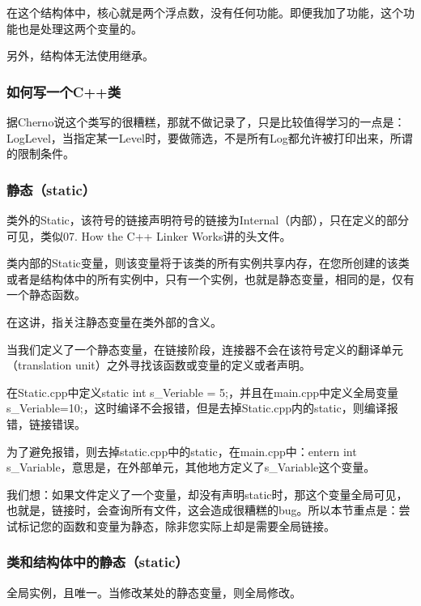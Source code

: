 在这个结构体中，核心就是两个浮点数，没有任何功能。即便我加了功能，这个功能也是处理这两个变量的。

另外，结构体无法使用继承。

\subsubsection{如何写一个C++类}

据Cherno说这个类写的很糟糕，那就不做记录了，只是比较值得学习的一点是：LogLevel，当指定某一Level时，要做筛选，不是所有Log都允许被打印出来，所谓的限制条件。

\subsubsection{静态（static）}

类外的Static，该符号的链接声明符号的链接为Internal（内部），只在定义的部分可见，类似07. How the C++ Linker Works讲的头文件。

类内部的Static变量，则该变量将于该类的所有实例共享内存，在您所创建的该类或者是结构体中的所有实例中，只有一个实例，也就是静态变量，相同的是，仅有一个静态函数。

在这讲，指关注静态变量在类外部的含义。

当我们定义了一个静态变量，在链接阶段，连接器不会在该符号定义的翻译单元（translation unit）之外寻找该函数或变量的定义或者声明。

在Static.cpp中定义{\ncodestyle static int s_Veriable = 5;}，并且在main.cpp中定义全局变量{\ncodestyle  s_Veriable=10;}，这时编译不会报错，但是去掉Static.cpp内的{\ncodestyle static}，则编译报错，链接错误。

为了避免报错，则去掉static.cpp中的{\ncodestyle static}，在main.cpp中：{\ncodestyle entern int s_Variable}，意思是，在外部单元，其他地方定义了{\ncodestyle s_Variable}这个变量。

我们想：如果文件定义了一个变量，却没有声明{\ncodestyle static}时，那这个变量全局可见，也就是，链接时，会查询所有文件，这会造成很糟糕的bug。所以本节重点是：尝试标记您的函数和变量为静态，除非您实际上却是需要全局链接。


\subsubsection{类和结构体中的静态（static）}

全局实例，且唯一。当修改某处的静态变量，则全局修改。

